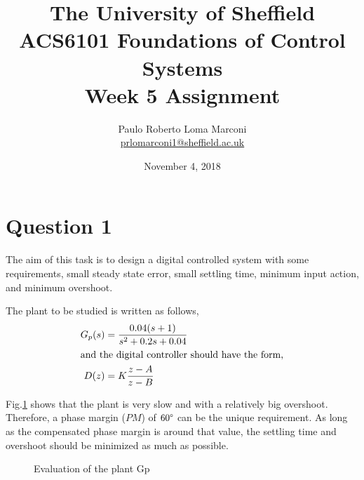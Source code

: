 \documentclass[11pt, a4paper]{article}
\title{The University of Sheffield\\
	ACS6101 Foundations of Control Systems\\ 
	Week 5 Assignment}
\author{Paulo Roberto Loma Marconi\\ \url{prlomarconi1@sheffield.ac.uk}}
\date{November 4, 2018}
\begin{document}
\maketitle

\section{Question 1}
The aim of this task is to design a digital controlled system with some requirements, small steady state error, small settling time, minimum input action, and minimum overshoot. 

The plant to be studied is written as follows,
\begin{align}
G_p(s) &= \dfrac{0.04(s+1)}{s^2+0.2s+0.04} \\
\intertext{and the digital controller should have the form,}
D(z) &= K\dfrac{z-A}{z-B}
\end{align}

Fig.\ref{fig:Q1_Gp} shows that the plant is very slow and with a relatively big overshoot. Therefore, a phase margin ($PM$) of $60\degree$ can be the unique requirement. As long as the compensated phase margin is around that value, the settling time and overshoot should be minimized as much as possible.
 
\begin{figure}[H]
	\centering
	\caption{Evaluation of the plant Gp}
	\label{fig:Q1_Gp}
\end{figure}
\end{document}
